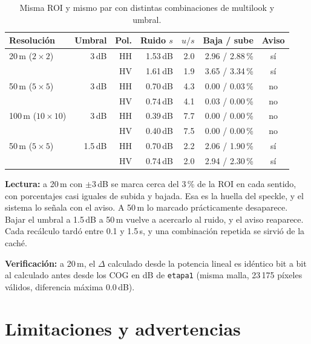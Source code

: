 \documentclass[11pt,a4paper]{article}
\begin{document}
\begin{table}[h]
\centering
\begin{tabular}{lrrrrrc}
\toprule
Resolución & Umbral & Pol. & Ruido $s$ & $u/s$ & Baja / sube & Aviso \\
\midrule
20\,m ($2\times2$)   & 3\,dB   & HH & 1.53\,dB & 2.0 & 2.96 / 2.88\,\% & sí \\
                    &         & HV & 1.61\,dB & 1.9 & 3.65 / 3.34\,\% & sí \\
50\,m ($5\times5$)   & 3\,dB   & HH & 0.70\,dB & 4.3 & 0.00 / 0.03\,\% & no \\
                    &         & HV & 0.74\,dB & 4.1 & 0.03 / 0.00\,\% & no \\
100\,m ($10\times10$) & 3\,dB  & HH & 0.39\,dB & 7.7 & 0.00 / 0.00\,\% & no \\
                    &         & HV & 0.40\,dB & 7.5 & 0.00 / 0.00\,\% & no \\
50\,m ($5\times5$)   & 1.5\,dB & HH & 0.70\,dB & 2.2 & 2.06 / 1.90\,\% & sí \\
                    &         & HV & 0.74\,dB & 2.0 & 2.94 / 2.30\,\% & sí \\
\bottomrule
\end{tabular}
\caption{Misma ROI y mismo par con distintas combinaciones de multilook y umbral.}
\label{tab:roi}
\end{table}

\textbf{Lectura:} a 20\,m con $\pm 3$\,dB se marca cerca del 3\,\% de la ROI en cada sentido, con
porcentajes casi iguales de subida y bajada. Esa es la huella del speckle, y el sistema lo señala
con el aviso. A 50\,m lo marcado prácticamente desaparece. Bajar el umbral a 1.5\,dB a 50\,m vuelve a
acercarlo al ruido, y el aviso reaparece. Cada recálculo tardó entre 0.1 y 1.5\,s, y una combinación
repetida se sirvió de la caché.

\textbf{Verificación:} a 20\,m, el $\Delta$ calculado desde la potencia lineal es idéntico bit a bit
al calculado antes desde los COG en dB de \texttt{etapa1} (misma malla, 23\,175 píxeles válidos,
diferencia máxima 0.0\,dB).

\section{Limitaciones y advertencias}
\end{document}

